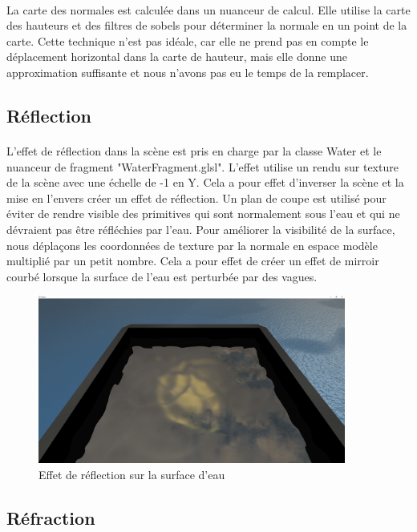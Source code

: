 \documentclass[a4paper, 12pt]{article} %
\begin{document}
	\paragraph{}
	La carte des normales est calculée dans un nuanceur de calcul. Elle utilise la carte des hauteurs et des filtres de sobels pour déterminer la normale en
	un point de la carte. Cette technique n'est pas idéale, car elle ne prend pas en compte le déplacement horizontal dans la carte de hauteur, mais elle donne
	une approximation suffisante et nous n'avons pas eu le temps de la remplacer. 
\subsection{Réflection}
	\paragraph{}
	L'effet de réflection dans la scène est pris en charge par la classe Water et le nuanceur de fragment "WaterFragment.glsl". L'effet utilise un rendu sur 
	texture de la scène avec une échelle de -1 en Y. Cela a pour effet d'inverser la scène et la mise en l'envers créer un effet de réflection. Un plan de 
	coupe est utilisé pour éviter de rendre visible des primitives qui sont normalement sous l'eau et qui ne dévraient pas être réfléchies par l'eau. Pour améliorer
	la visibilité de la surface, nous déplaçons les coordonnées de texture par la normale en espace modèle multiplié par un petit nombre. Cela a pour effet de 
	créer un effet de mirroir courbé lorsque la surface de l'eau est perturbée par des vagues.
\begin{figure}
	\centering
	\includegraphics[width=0.9\textwidth]{./PhotoRapport/Reflection.png}
	\caption{Effet de réflection sur la surface d'eau}
	\label{Reflection}
\end{figure}
\subsection{Réfraction}
\end{document}
